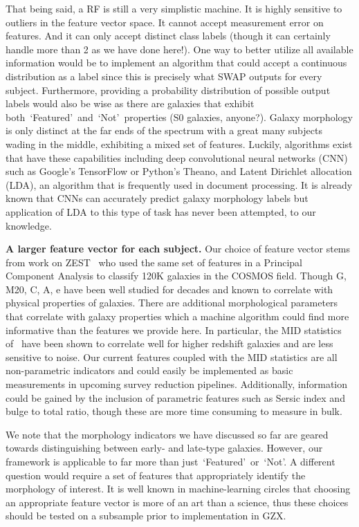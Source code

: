 \documentclass[twocolumn]{aastex6}
\newcommand{\feat}{`Featured'}
\newcommand{\notfeat}{`Not'}
\begin{document}
That being said, a RF is still a very simplistic machine. It is highly sensitive to outliers
in the feature vector space. It cannot accept measurement error on features. And it 
can only accept distinct class labels (though it can certainly handle more than 2 as we
have done here!). One way to better utilize all available information would be to 
implement an algorithm that could accept a continuous distribution as a label since 
this is precisely what SWAP outputs for every subject. Furthermore, providing a 
probability distribution of possible output labels would also be wise as there are 
galaxies that exhibit both~\feat~and~\notfeat~properties (S0 galaxies, anyone?). 
Galaxy morphology is only distinct at the far ends of the spectrum with a great 
many subjects wading in the middle, exhibiting a mixed set of features. Luckily, 
algorithms exist that have these capabilities including deep convolutional neural
networks (CNN) such as  Google's TensorFlow or Python's Theano, 
and Latent Dirichlet allocation (LDA), an algorithm that is frequently used in 
document processing. It is already known that CNNs can accurately predict 
galaxy morphology labels but application of LDA to this type of task has never 
been attempted, to our knowledge. 

\textbf{A larger feature vector for each subject.} 
Our choice of feature vector stems from work on ZEST~\citep{Scarlata2007} who 
used the same set of features in a Principal Component Analysis to classify 120K 
galaxies in the COSMOS field. Though G, M20, C, A, e have been well studied for
decades and known to correlate with physical properties of galaxies. There are 
additional morphological parameters that correlate with galaxy properties which 
a machine algorithm could find more informative than the features we provide here. 
In particular, the MID statistics of~\cite{Freeman2013} have been shown to correlate
well for higher redshift galaxies and are less sensitive to noise. Our current features
coupled with the MID statistics are all non-parametric indicators and could easily be implemented
as basic measurements in upcoming survey reduction pipelines. Additionally, 
information could be gained by the inclusion of parametric features such as 
 Sersic index and bulge to total ratio, though these are more time consuming to 
measure in bulk. 

We note that the morphology indicators we have discussed so far are geared towards
 distinguishing between early- and late-type galaxies. However, our framework is applicable
 to far more than just~\feat~or~\notfeat. A different question would require a  set of
 features that appropriately identify the morphology of interest. 
It is well known in machine-learning circles that choosing an appropriate feature 
vector is more of an art than a science, thus these choices should be tested on a 
 subsample prior to implementation in GZX. 
\end{document}
